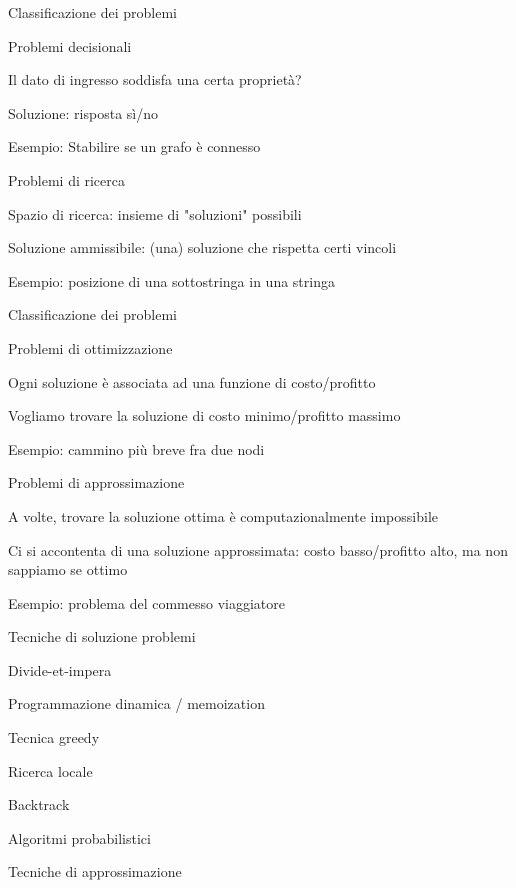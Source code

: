 \begin{frame}{Classificazione dei problemi}

\begin{block}{Problemi decisionali}
\BIL
\item Il dato di ingresso soddisfa una certa proprietà?
\item Soluzione: risposta sì/no
\item Esempio: Stabilire se un grafo è connesso
\EIL
\end{block}
\begin{block}{Problemi di ricerca}
\BIL
\item Spazio di ricerca: insieme di "soluzioni" possibili
\item Soluzione ammissibile: (una) soluzione che rispetta certi vincoli
\item Esempio: posizione di una sottostringa in una stringa
\EIL
\end{block}

\end{frame}

\begin{frame}{Classificazione dei problemi}

\begin{block}{Problemi di ottimizzazione}
\BIL
\item Ogni soluzione è associata ad una funzione di costo/profitto
\item Vogliamo trovare la soluzione di costo minimo/profitto massimo
\item Esempio: cammino più breve fra due nodi
\EIL
\end{block}

\begin{block}{Problemi di approssimazione}
\BIL
\item A volte, trovare la soluzione ottima è computazionalmente impossibile
\item Ci si accontenta di una soluzione approssimata: costo basso/profitto alto, ma non sappiamo se ottimo
\item Esempio: problema del commesso viaggiatore
\EIL
\end{block}

\end{frame}

\begin{frame}{Tecniche di soluzione problemi}

\BIL
\item Divide-et-impera 
\item Programmazione dinamica / memoization
\item Tecnica greedy
\item Ricerca locale 
\item Backtrack
\item Algoritmi probabilistici
\item Tecniche di approssimazione
\EIL

\end{frame}

